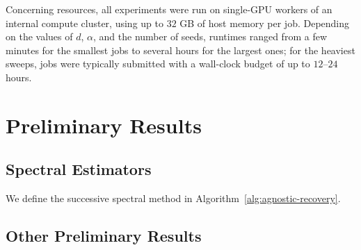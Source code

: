 \documentclass[]{article}
\numberwithin{equation}{section}
\theoremstyle{definition}
\begin{document}
Concerning resources, all experiments were run on single-GPU workers of an internal compute cluster, using up to $32$ GB of host memory per job. 
Depending on the values of $d$, $\alpha$, and the number of seeds, runtimes ranged from a few minutes for the smallest jobs to several hours for the largest ones; for the heaviest sweeps, jobs were typically submitted with a wall-clock budget of up to $12$--$24$ hours.


\section{Preliminary Results}
\label{appendix:preliminaries}
\subsection{Spectral Estimators}\label{subsec:spec_estimator}

We define the successive spectral method in Algorithm~\ref{alg:agnostic-recovery}.


\subsection{Other Preliminary Results}
\end{document}
